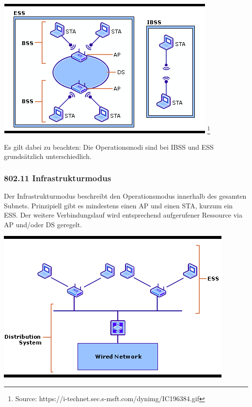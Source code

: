 \documentclass[11pt]{article}
\begin{document}
    \includegraphics[width=\textwidth]{802-11_Architecture.png}
    \footnote[1{\emph{\small{Graphical Layout of the 802.11 Architecture}}}]{Source: https://i-technet.sec.s-msft.com/dynimg/IC196384.gif}

    Es gilt dabei zu beachten: Die Operationsmodi sind bei IBSS und ESS grundsätzlich unterschiedlich.

    \subsubsection{802.11 Infrastrukturmodus}
    Der Infrastrukturmodus beschreibt den Operationsmodus innerhalb des gesamten Subnets.
    Prinzipiell gibt es mindestens einen AP und einen STA, kurzum ein ESS. Der weitere Verbindungslauf wird entsprechend
    aufgerufener Ressource via AP und/oder DS geregelt.

    \includegraphics[width=\textwidth]{802-11_Infrastrukturmodus.png}
\end{document}
